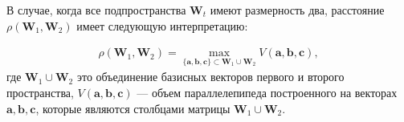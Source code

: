 В случае, когда все подпространства $\textbf{W}_t$ имеют размерность два, расстояние $\rho\left(\textbf{W}_1, \textbf{W}_2\right)$ имеет следующую интерпретацию:

\[
\label{eq:cl:5}
\begin{aligned}
\rho\left(\textbf{W}_1, \textbf{W}_2\right) = \max_{\{\textbf{a},\textbf{b},\textbf{c}\} \subset \textbf{W}_1\cup \textbf{W}_2 } V\left(\textbf{a},\textbf{b},\textbf{c}\right), 
\end{aligned}
\]
где $\textbf{W}_1\cup\textbf{W}_2$ это объединение базисных векторов первого и второго пространства, $V\left(\textbf{a},\textbf{b},\textbf{c}\right)$ --- объем параллелепипеда построенного на векторах $\textbf{a}, \textbf{b}, \textbf{c}$, которые являются столбцами матрицы $\textbf{W}_1\cup\textbf{W}_2$.


